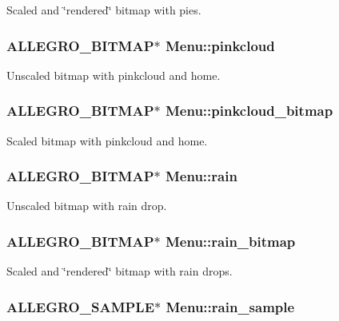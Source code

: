 Scaled and \char`\"{}rendered\char`\"{} bitmap with pies. \hypertarget{structMenu_aec110fca9c47ccf9aaf6e4e7589b86f2}{
\subsubsection[{pinkcloud}]{\setlength{\rightskip}{0pt plus 5cm}A\-L\-L\-E\-G\-R\-O\-\_\-\-B\-I\-T\-M\-A\-P$\ast$ Menu\-::pinkcloud}}\label{structMenu_aec110fca9c47ccf9aaf6e4e7589b86f2}
Unscaled bitmap with pinkcloud and home. \hypertarget{structMenu_a970ef9c492ae797fc59d22fa6cfead71}{
\subsubsection[{pinkcloud\-\_\-bitmap}]{\setlength{\rightskip}{0pt plus 5cm}A\-L\-L\-E\-G\-R\-O\-\_\-\-B\-I\-T\-M\-A\-P$\ast$ Menu\-::pinkcloud\-\_\-bitmap}}\label{structMenu_a970ef9c492ae797fc59d22fa6cfead71}
Scaled bitmap with pinkcloud and home. \hypertarget{structMenu_a3ba357f6bd47ac51f9aa9b9c381bbe9f}{
\subsubsection[{rain}]{\setlength{\rightskip}{0pt plus 5cm}A\-L\-L\-E\-G\-R\-O\-\_\-\-B\-I\-T\-M\-A\-P$\ast$ Menu\-::rain}}\label{structMenu_a3ba357f6bd47ac51f9aa9b9c381bbe9f}
Unscaled bitmap with rain drop. \hypertarget{structMenu_a9207cdbfc8c670d9069c9a2c64c6ca95}{
\subsubsection[{rain\-\_\-bitmap}]{\setlength{\rightskip}{0pt plus 5cm}A\-L\-L\-E\-G\-R\-O\-\_\-\-B\-I\-T\-M\-A\-P$\ast$ Menu\-::rain\-\_\-bitmap}}\label{structMenu_a9207cdbfc8c670d9069c9a2c64c6ca95}
Scaled and \char`\"{}rendered\char`\"{} bitmap with rain drops. \hypertarget{structMenu_ad14705d9172d76dc241de8f4657254cc}{
\subsubsection[{rain\-\_\-sample}]{\setlength{\rightskip}{0pt plus 5cm}A\-L\-L\-E\-G\-R\-O\-\_\-\-S\-A\-M\-P\-L\-E$\ast$ Menu\-::rain\-\_\-sample}}\label{structMenu_ad14705d9172d76dc241de8f4657254cc}
